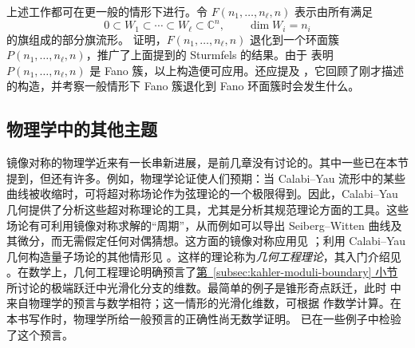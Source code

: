 上述工作都可在更一般的情形下进行。令 $F(n_1,\ldots,n_\ell,n)$ 表示由所有满足
\[
0\subset W_1\subset\cdots\subset W_\ell\subset\mathbb C^n,
\qquad \dim W_i=n_i
\]
的旗组成的部分旗流形。 证明，$F(n_1,\ldots,n_\ell,n)$ 退化到一个环面簇 $P(n_1,\ldots,n_\ell,n)$，推广了上面提到的 Sturmfels 的结果。由于  表明 $P(n_1,\ldots,n_\ell,n)$ 是 Fano 簇，以上构造便可应用。还应提及 ，它回顾了刚才描述的构造，并考察一般情形下 Fano 簇退化到 Fano 环面簇时会发生什么。

\subsection{物理学中的其他主题}\label{subsec:other-physics-topics}
镜像对称的物理学近来有一长串新进展，是前几章没有讨论的。其中一些已在本节提到，但还有许多。例如，物理学论证使人们预期：当 Calabi--Yau 流形中的某些曲线被收缩时，可将超对称场论作为弦理论的一个极限得到。因此，Calabi--Yau 几何提供了分析这些超对称理论的工具，尤其是分析其规范理论方面的工具。这些场论有可利用镜像对称求解的“周期”，从而例如可以导出 Seiberg--Witten 曲线及其微分，而无需假定任何对偶猜想。这方面的镜像对称应用见 ；利用 Calabi--Yau 几何构造量子场论的其他情形见 。这样的理论称为\emph{几何工程理论}，其入门介绍见 。在数学上，几何工程理论明确预言了\hyperref[subsec:kahler-moduli-boundary]{第~\ref*{subsec:kahler-moduli-boundary} 小节}所讨论的极端跃迁中光滑化分支的维数。最简单的例子是锥形奇点跃迁，此时  中来自物理学的预言与数学相符；这一情形的光滑化维数，可根据  作数学计算。在本书写作时，物理学所给一般预言的正确性尚无数学证明。 已在一些例子中检验了这个预言。
